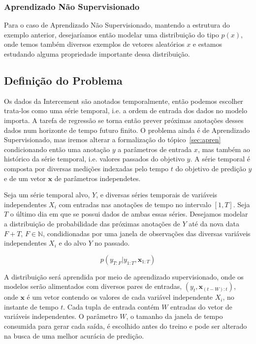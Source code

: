\subsubsection{Aprendizado Não Supervisionado}

Para o caso de Aprendizado Não Supervisionado, mantendo a estrutura do exemplo
anterior, desejaríamos então modelar uma distribuição do tipo $p(x)$, onde temos
também diversos exemplos de vetores aleatórios $x$ e estamos estudando alguma propriedade importante dessa distribuição.


\subsection{Definição do Problema}


Os dados da Intercement são anotados temporalmente, então podemos escolher
trata-los como uma série temporal, i.e. a ordem de entrada dos dados no modelo
importa. A tarefa de regressão se torna então prever próximas anotações desses
dados num horizonte de tempo futuro finito. O problema ainda é de Aprendizado
Supervisionado, mas iremos alterar a formalização do tópico~\ref{sec:apren}
condicionando então uma anotação $y$ a parâmetros de entrada $x$, mas também ao
histórico da série temporal, i.e. valores passados do objetivo $y$. A série
temporal é composta por diversas medições indexadas pelo tempo $t$ do objetivo
de predição $y$ e de um vetor $\textbf{x}$ de parâmetros independetes.


Seja um série temporal alvo, $Y$, e diversas séries temporais de variáveis
independentes $X_i$ com entradas nas anotações de tempo no intervalo $[1,T]$. Seja $T$ o último dia em que se possui dados de ambas essas
séries. Desejamos modelar a distribuição de probabilidade das próximas anotações
de $Y$ até da nova data $F + T$, $F \in \mathbb{N}$, condidionadas por uma janela de
observações das diversas variáveis independentes $X_i$ e do alvo $Y$ no passado.


\[ p(y_{T:F} | y_{1:T},\textbf{x}_{{1}:T}) \]

A distribuição será aprendida por meio de aprendizado supervisionado, onde os
modelos serão alimentados com diversos pares de entradas,
$(y_t,\textbf{x}_{(t-W):t})$, onde $\textbf{x}$ é um vetor contendo os valores de
cada variável independente $X_i$, no instante de tempo $t$. Cada tupla de
entrada contém $W$ entradas do vetor de variáveis independentes. O parâmetro $W$, o
tamanho da janela de tempo consumida para gerar cada saída, é escolhido antes do
treino e pode ser alterado na busca de uma melhor acurácia de predição.




